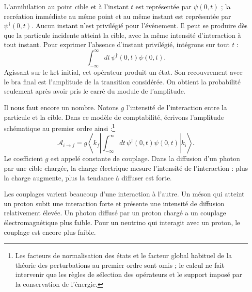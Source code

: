 L’annihilation au point cible et à l’instant \(t\) est représentée par \(\psi(0,t)\) ; la recréation immédiate au même point et au même instant est représentée par \(\psi^\dagger(0,t)\). Aucun instant n’est privilégié pour l’événement. Il peut se produire dès que la particule incidente atteint la cible, avec la même intensité d’interaction à tout instant. Pour exprimer l’absence d’instant privilégié, intégrons sur tout \(t\) :
\begin{equation}
\int_{-\infty}^{\infty}dt\,\psi^\dagger(0,t)\psi(0,t).
\end{equation}
Agissant sur le ket initial, cet opérateur produit un état. Son recouvrement avec le bra final est l’amplitude de la transition considérée. On obtient la probabilité seulement après avoir pris le carré du module de l’amplitude.

Il nous faut encore un nombre. Notons \(g\) l’intensité de l’interaction entre la particule et la cible. Dans ce modèle de comptabilité, écrivons l’amplitude schématique au premier ordre ainsi :\footnote{Les facteurs de normalisation des états et le facteur global habituel de la théorie des perturbations au premier ordre sont omis ; le calcul ne fait intervenir que les règles de sélection des opérateurs et le support imposé par la conservation de l’énergie.}
\begin{equation}
\mathcal A_{i\to f}
=g\left\langle k_f\left|
\int_{-\infty}^{\infty}dt\,
\psi^\dagger(0,t)\psi(0,t)
\right|k_i\right\rangle.
\end{equation}
Le coefficient \(g\) est appelé constante de couplage. Dans la diffusion d’un photon par une cible chargée, la charge électrique mesure l’intensité de l’interaction : plus la charge augmente, plus la tendance à diffuser est forte.

Les couplages varient beaucoup d’une interaction à l’autre. Un méson qui atteint un proton subit une interaction forte et présente une intensité de diffusion relativement élevée. Un photon diffusé par un proton chargé a un couplage électromagnétique plus faible. Pour un neutrino qui interagit avec un proton, le couplage est encore plus faible.

\begin{classroomqa}\end{classroomqa}

